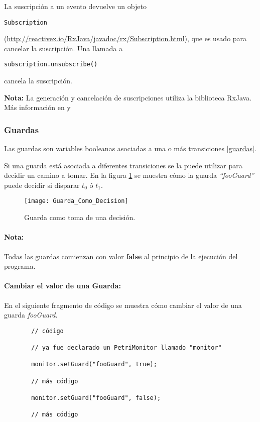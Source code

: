 La suscripción a un evento devuelve un objeto
\begin{verbatim}
Subscription
\end{verbatim} 
(\url{http://reactivex.io/RxJava/javadoc/rx/Subscription.html}),
que es usado para cancelar la suscripción.
Una llamada a
\begin{verbatim}
subscription.unsubscribe()
\end{verbatim} 
cancela la suscripción.

\begin{framed}
\textbf{Nota:} La generación y cancelación de suscripciones utiliza la
biblioteca RxJava. Más información en \cite{RxJava} y \cite{RxJavaJavadoc}
\end{framed}

\subsubsection{Guardas}
\label{sec:guardas_monitor}
Las guardas son variables booleanas asociadas a una o más transiciones
\ref{guardas}.

Si una guarda está asociada a diferentes transiciones se la puede utilizar para
decidir un camino a tomar. En la figura \ref{fig:guarda_como_decision} se
muestra cómo la guarda \textit{``fooGuard''} puede decidir si disparar $t_{0}$ ó
$t_{1}$.

\begin{figure}[H]
  \centering
  \texttt{[image: Guarda\_Como\_Decision]}
  \caption{Guarda como toma de una decisión.}
  \label{fig:guarda_como_decision}
\end{figure}

\begin{framed}
\paragraph{Nota:} Todas las guardas comienzan con valor \textbf{false} al
principio de la ejecución del programa.
\end{framed}

\paragraph{Cambiar el valor de una Guarda:} En el siguiente fragmento de código
se muestra cómo cambiar el valor de una guarda \textit{fooGuard}.

\begin{figure}[H]
\centering
\begin{verbatim}
  // código
  
  // ya fue declarado un PetriMonitor llamado "monitor"
  
  monitor.setGuard("fooGuard", true);
  
  // más código
  
  monitor.setGuard("fooGuard", false);
  
  // más código
\end{verbatim}
\end{figure}

